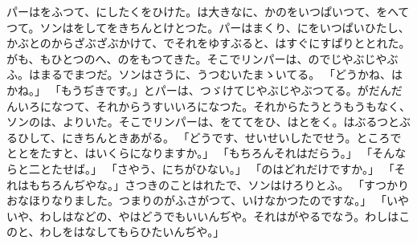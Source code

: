 \documentclass[a4paper,
tate,
book]
{jlreq}
\begin{document}
  パーはをふつて、にしたくをひけた。は大きなに、かのをいつぱいつて、をへてつて。ソンはをしてをきちんとけとつた。パーはまくり、にをいつぱいひたし、かぶとのからざぶざぶかけて、でそれをゆすぶると、はすぐにすぱりととれた。がも、もひとつのへ、のをもつてきた。そこでリンパーは、のでじやぶじやぶふ。はまるでまつだ。ソンはさうに、うつむいたまゝいてる。
「どうかね、はかね。」
「もうぢきです。」とパーは、つゞけてじやぶじやぶつてる。がだんだんいろになつて、それからうすいいろになつた。それからたうとうもうもなく、ソンのは、よりいた。そこでリンパーは、をててをひ、はとをく。はぶるつとぶるひして、にきちんときあがる。
「どうです、せいせいしたでせう。ところでととをたすと、はいくらになりますか。」
「もちろんそれはだらう。」
「そんならと二とたせば。」
「さやう、にちがひない。」
「のはどれだけですか。」
「それはもちろんぢやな。」さつきのことはれたで、ソンはけろりとふ。
「すつかりおなほりなりました。つまりのがふさがつて、いけなかつたのですな。」
「いやいや、わしはなどの、やはどうでもいいんぢや。それはがやるでなう。わしはこのと、わしをはなしてもらひたいんぢや。」
\end{document}
